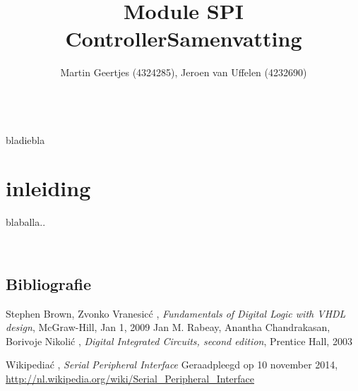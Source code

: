 \documentclass[a4paper, 10 pt]{report}
\title{Module SPI Controller}
\author{Martin Geertjes (4324285), Jeroen van Uffelen (4232690)}
\begin{document}
\maketitle
\newpage
\title{\textbf{Samenvatting}}\\
bladiebla

\newpage


\chapter{inleiding}
blaballa..\\

\newpage 



\
\newpage
\section{Bibliografie}
\begin{thebibliography}{10}
		Stephen Brown, Zvonko Vranesic\'c , 							\emph{Fundamentals of Digital Logic with VHDL design}, McGraw-Hill, Jan 1, 2009	
	\bibitem{ds_book}	Jan M. Rabeay, Anantha Chandrakasan, Borivoje Nikoli\'c , 							\emph{Digital Integrated Circuits, second edition}, Prentice Hall, 2003
	
	Wikipedia\'c , \emph{Serial Peripheral Interface} Geraadpleegd op 10 november 2014, \url{http://nl.wikipedia.org/wiki/Serial_Peripheral_Interface}

\end{thebibliography}




%
\end{document}
